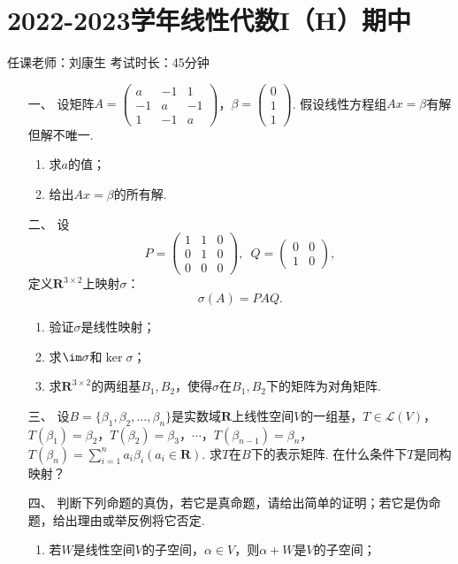 \section*{2022-2023学年线性代数I（H）期中}

\begin{center}
    任课老师：刘康生\hspace{4em} 考试时长：45分钟
\end{center}
\begin{enumerate}
	\item[一、] 设矩阵$A=\begin{pmatrix}
        a & -1 & 1 \\ -1 & a & -1 \\ 1 & -1 & a
    \end{pmatrix}$，$\beta=\begin{pmatrix}
        0 \\ 1 \\ 1
    \end{pmatrix}$. 假设线性方程组$Ax=\beta$有解但解不唯一.
    \begin{enumerate}[label=(\arabic*)]
        \item 求$a$的值；

        \item 给出$Ax=\beta$的所有解.
    \end{enumerate}
	\item[二、]设
	\[P=\begin{pmatrix}
        1 & 1 & 0 \\ 0 & 1 & 0 \\ 0 & 0 & 0
    \end{pmatrix},\enspace Q=\begin{pmatrix}
        0 & 0 \\ 1 & 0
    \end{pmatrix},\]
    定义$\mathbf{R}^{3\times 2}$上映射$\sigma$：
    \[\sigma(A)=PAQ.\]
    \begin{enumerate}[label=(\arabic*)]
        \item 验证$\sigma$是线性映射；

        \item 求$\im\sigma$和$\ker\sigma$；

        \item 求$\mathbf{R}^{3\times 2}$的两组基$B_1,B_2$，使得$\sigma$在$B_1,B_2$下的矩阵为对角矩阵.
    \end{enumerate}
	\item[三、]设$B=\{\beta_1,\beta_2,\ldots,\beta_n\}$是实数域$\mathbf{R}$上线性空间$V$的一组基，$T\in\mathcal{L}(V)$，$T(\beta_1)=\beta_2$，$T(\beta_2)=\beta_3$，$\cdots$，$T(\beta_{n-1})=\beta_n$，$T(\beta_n)=\sum\limits_{i=1}^{n}a_i\beta_i(a_i\in\mathbf{R})$. 求$T$在$B$下的表示矩阵. 在什么条件下$T$是同构映射？
	\item[四、]判断下列命题的真伪，若它是真命题，请给出简单的证明；若它是伪命题，给出理由或举反例将它否定.
	\begin{enumerate}[label=(\arabic*)]
        \item 若$W$是线性空间$V$的子空间，$\alpha\in V$，则$\alpha+W$是$V$的子空间；


\end{enumerate}
\end{enumerate}
